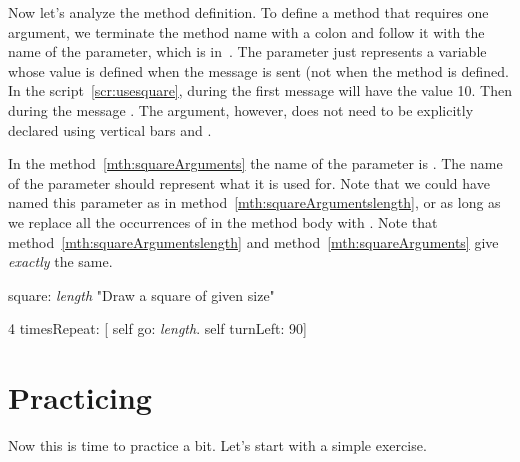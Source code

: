 Now \newcommand{\replace}[2]{let us}{let's} analyze the method definition.  To define a method that requires one  argument, we \newcommand{\replace}[2]{terminated}{terminate} the method name with a colon \ct{:} and \newcommand{\replace}[2]{we wrote}{follow it with} the name of the parameter, \newcommand{\replace}[2]{\eg}{which is}  in~. \newcommand{\add}[1]{\paragraph
}
The parameter just represents a variable whose value is defined when the message is sent \newcommand{\replace}[2]{and }{(}not when the method is defined\newcommand{\add}[1]{)}. In the script~\ref{scr:usesquare}, \newcommand{\remove}[1]{\ct{size} will take the value 10} during the first message  \newcommand{\replace}[2]{and then 20}{ will have the value 10. Then} during the message \newcommand{\add}[1]{, \ct{size} will have the value 20}.  The argument, however, does not need to be explicitly declared using vertical bars \ct{|} and \ct{|}.
 
In the method~\ref{mth:squareArguments} the name of the parameter is . The name of the parameter should represent what it is used for. Note that we could have named this parameter  as in method~\ref{mth:squareArgumentslength}, or  \newcommand{\add}[1]{---} as \newcommand{\replace}[2]{soon}{long} as we replace \newcommand{\remove}[1]{in the method body} all the \newcommand{\replace}[2]{occurences}{occurrences} of  \newcommand{\replace}[2]{by}{in the method body with} . Note that  \newcommand{\remove}[1]{thes} method~\ref{mth:squareArgumentslength} and  method~\ref{mth:squareArguments} \newcommand{\replace}[2]{are}{give} \emph{exactly} the same\newcommand{\add}[1]{ results}.

\begin{method}\label{mth:squareArgumentslength}
square: \emph{length}
   "Draw a square of \newcommand{\add}[1]{the} given size"

   4 timesRepeat: 
                    [ self go: \emph{length}.
                    self turnLeft: 90]
\end{method}


\section{Practicing}
Now this is time to practice a bit. \newcommand{\replace}[2]{Let us}{Let's} start with a simple exercise.

